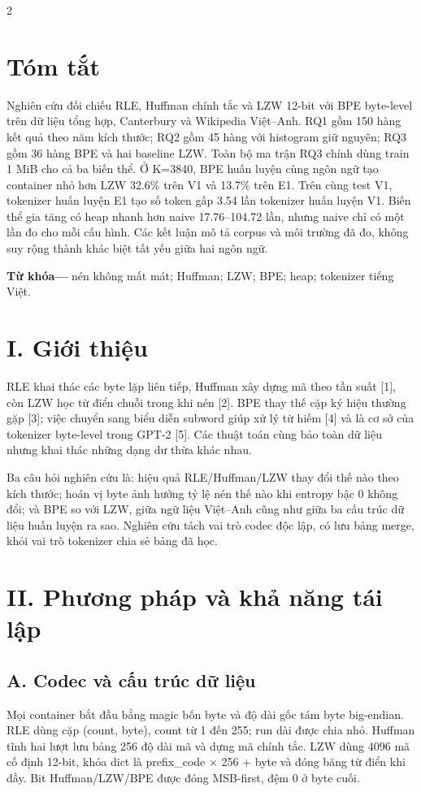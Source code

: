 \documentclass[10pt,letterpaper]{article}
\begin{document}
\begin{multicols}{2}
\section*{Tóm tắt}
Nghiên cứu đối chiếu RLE, Huffman chính tắc và LZW 12-{}bit với BPE byte-{}level trên dữ liệu tổng hợp, Canterbury và Wikipedia Việt–Anh. RQ1 gồm 150 hàng kết quả theo năm kích thước; RQ2 gồm 45 hàng với histogram giữ nguyên; RQ3 gồm 36 hàng BPE và hai baseline LZW. Toàn bộ ma trận RQ3 chính dùng train 1 MiB cho cả ba biến thể. Ở K=3840, BPE huấn luyện cùng ngôn ngữ tạo container nhỏ hơn LZW 32.6\% trên V1 và 13.7\% trên E1. Trên cùng test V1, tokenizer huấn luyện E1 tạo số token gấp 3.54 lần tokenizer huấn luyện V1. Biến thể gia tăng có heap nhanh hơn naive 17.76–104.72 lần, nhưng naive chỉ có một lần đo cho mỗi cấu hình. Các kết luận mô tả corpus và môi trường đã đo, không suy rộng thành khác biệt tất yếu giữa hai ngôn ngữ.

\textbf{Từ khóa—} nén không mất mát; Huffman; LZW; BPE; heap; tokenizer tiếng Việt.

\section*{I. Giới thiệu}
RLE khai thác các byte lặp liên tiếp, Huffman xây dựng mã theo tần suất [1], còn LZW học từ điển chuỗi trong khi nén [2]. BPE thay thế cặp ký hiệu thường gặp [3]; việc chuyển sang biểu diễn subword giúp xử lý từ hiếm [4] và là cơ sở của tokenizer byte-{}level trong GPT-{}2 [5]. Các thuật toán cùng bảo toàn dữ liệu nhưng khai thác những dạng dư thừa khác nhau.

Ba câu hỏi nghiên cứu là: hiệu quả RLE/\allowbreak{}Huffman/\allowbreak{}LZW thay đổi thế nào theo kích thước; hoán vị byte ảnh hưởng tỷ lệ nén thế nào khi entropy bậc 0 không đổi; và BPE so với LZW, giữa ngữ liệu Việt–Anh cũng như giữa ba cấu trúc dữ liệu huấn luyện ra sao. Nghiên cứu tách vai trò codec độc lập, có lưu bảng merge, khỏi vai trò tokenizer chia sẻ bảng đã học.

\section*{II. Phương pháp và khả năng tái lập}
\subsection*{A. Codec và cấu trúc dữ liệu}
Mọi container bắt đầu bằng magic bốn byte và độ dài gốc tám byte big-{}endian. RLE dùng cặp (count, byte), count từ 1 đến 255; run dài được chia nhỏ. Huffman tĩnh hai lượt lưu bảng 256 độ dài mã và dựng mã chính tắc. LZW dùng 4096 mã cố định 12-{}bit, khóa dict là prefix\_\allowbreak{}code \ensuremath{\times} 256 + byte và đóng băng từ điển khi đầy. Bit Huffman/\allowbreak{}LZW/\allowbreak{}BPE được đóng MSB-{}first, đệm 0 ở byte cuối.


\end{multicols}
\end{document}

